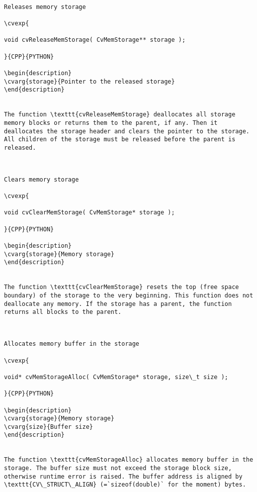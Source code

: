 \begin{verbatim}

Releases memory storage

\cvexp{

void cvReleaseMemStorage( CvMemStorage** storage );

}{CPP}{PYTHON}

\begin{description}
\cvarg{storage}{Pointer to the released storage}
\end{description}


The function \texttt{cvReleaseMemStorage} deallocates all storage memory blocks or returns them to the parent, if any. Then it deallocates the storage header and clears the pointer to the storage. All children of the storage must be released before the parent is released.


\end{verbatim}
\begin{verbatim}

Clears memory storage

\cvexp{

void cvClearMemStorage( CvMemStorage* storage );

}{CPP}{PYTHON}

\begin{description}
\cvarg{storage}{Memory storage}
\end{description}


The function \texttt{cvClearMemStorage} resets the top (free space boundary) of the storage to the very beginning. This function does not deallocate any memory. If the storage has a parent, the function returns all blocks to the parent.


\end{verbatim}
\begin{verbatim}

Allocates memory buffer in the storage

\cvexp{

void* cvMemStorageAlloc( CvMemStorage* storage, size\_t size );

}{CPP}{PYTHON}

\begin{description}
\cvarg{storage}{Memory storage}
\cvarg{size}{Buffer size}
\end{description}


The function \texttt{cvMemStorageAlloc} allocates memory buffer in the storage. The buffer size must not exceed the storage block size, otherwise runtime error is raised. The buffer address is aligned by \texttt{CV\_STRUCT\_ALIGN} (=`sizeof(double)` for the moment) bytes.


\end{verbatim}

